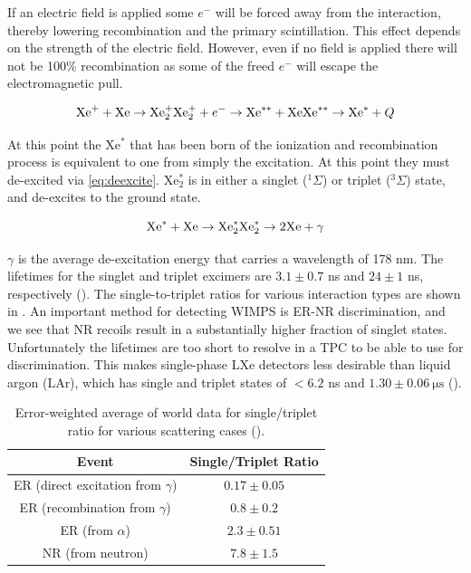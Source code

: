 If
an electric field is applied some $e^{-}$ will be forced away from the interaction, thereby lowering recombination and the primary
scintillation.  This effect depends on the strength of the electric field.  However, even if no field is applied there will not be
100\% recombination as some of the freed $e^{-}$ will escape the electromagnetic pull.

\begin{equation}
\mathrm{Xe}^{+} + \mathrm{Xe} \rightarrow \mathrm{Xe}_{2}^{+} \\
\mathrm{Xe}_{2}^{+} + e^{-} \rightarrow \mathrm{Xe}^{**} + \mathrm{Xe} \\
\mathrm{Xe}^{**} \rightarrow \mathrm{Xe}^{*} + Q \\
\label{eq:recomb}
\end{equation}

\noindent At this point the Xe$^{*}$ that has been born of the ionization and recombination process is equivalent to one from simply the
excitation.  At this point they must de-excited via \eqref{eq:deexcite}.  Xe$_{2}^{*}$ is in either a singlet
($^{1}\Sigma$) or triplet ($^{3}\Sigma$) state, and de-excites to the ground state.

\begin{equation}
\mathrm{Xe}^{*} + \mathrm{Xe} \rightarrow \mathrm{Xe}_{2}^{*} \\
\mathrm{Xe}_{2}^{*} \rightarrow 2\mathrm{Xe} + \gamma
\label{eq:deexcite}
\end{equation}

\noindent $\gamma$ is the average de-excitation energy that carries a wavelength of 178 nm.  The lifetimes for the singlet and triplet
excimers are $3.1 \pm 0.7$ ns and $24 \pm 1$ ns, respectively ().  The single-to-triplet ratios for
various interaction types are shown in .  An important method for detecting WIMPS is ER-NR
discrimination, and we see that NR recoils result in a substantially higher fraction of singlet states.  Unfortunately the lifetimes
are too short to resolve in a TPC to be able to use for discrimination.  This makes single-phase LXe detectors
less desirable than liquid argon (LAr), which has single and triplet states of $< 6.2$ ns and $1.30 \pm 0.06\ \mathrm{\mu s}$
().

\begin{table}[t]
 \centering
 \begin{tabular}{cc}
 \hline
 Event & Single/Triplet Ratio \\
 \hline
 ER (direct excitation from $\gamma$) & $0.17 \pm 0.05$ \\
 ER (recombination from $\gamma$) & $0.8 \pm 0.2$ \\
 ER (from $\alpha$) & $2.3 \pm 0.51$ \\
 NR (from neutron) & $7.8 \pm 1.5$ \\
 \hline
 \end{tabular}
 \caption{Error-weighted average of world data for single/triplet ratio for various scattering cases ().}
\label{tab:singlet_to_triplet}
\end{table}

